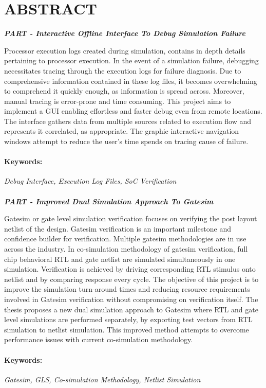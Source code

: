 \section*{\centering ABSTRACT}
\newcommand{\RNum}[1]{\uppercase\expandafter{\romannumeral #1\relax}}


\centerline{\emph{\bf PART \RNum{1}- Interactive Offline Interface To Debug Simulation Failure }}
\vspace{5pt}
Processor execution logs created during simulation, contains in depth details pertaining to processor execution.  In the event of a simulation failure, debugging necessitates tracing through the execution logs for failure diagnosis.  Due to comprehensive information contained in these log files, it becomes overwhelming to comprehend it quickly enough, as information is spread across. Moreover, manual tracing is error-prone and time consuming.
This project aims to implement a GUI  enabling effortless and faster debug even from remote locations. The interface gathers data from multiple sources related to execution flow and represents it correlated, as appropriate. The graphic interactive navigation windows attempt to reduce the user's time spends on tracing cause of failure.



\paragraph{Keywords:}
 \emph{Debug Interface, Execution Log Files, SoC  Verification}


 \paragraph{}

\centerline{\emph{\bf PART \RNum{2}- Improved Dual Simulation Approach To Gatesim}}
\vspace{5pt}
Gatesim or gate level simulation verification focuses on verifying the post layout netlist of the design. Gatesim verification is an important milestone and confidence builder for verification. Multiple gatesim methodologies are in use across the industry. In co-simulation methodology of gatesim verification, full chip behavioral RTL  and gate netlist are simulated simultaneously in one simulation. Verification is achieved by driving corresponding RTL stimulus onto netlist and by comparing response every cycle.
The objective of this project is to improve the simulation turn-around times and reducing resource requirements involved in Gatesim verification without compromising on verification itself. The thesis proposes a new dual simulation approach to Gatesim where RTL and gate level simulations are performed separately, by exporting test vectors from RTL simulation to netlist simulation. This improved method attempts to overcome performance issues with current co-simulation methodology.

\paragraph{Keywords:}
 \emph{Gatesim,  GLS,  Co-simulation Methodology, Netlist Simulation}




